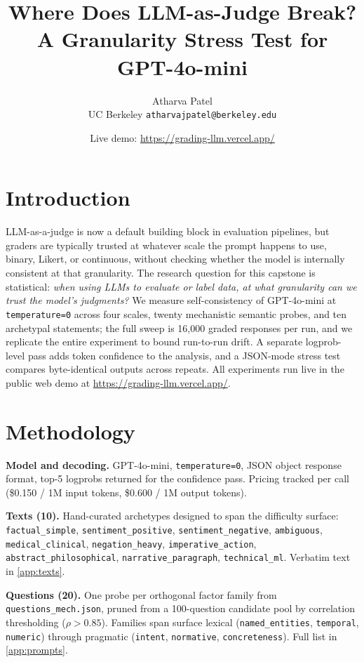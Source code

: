 \documentclass[11pt]{article}
\title{\vspace{-2em}Where Does LLM-as-Judge Break?\\\large A Granularity Stress Test for GPT-4o-mini}
\author{Atharva Patel \\ \small UC Berkeley \quad \texttt{atharvajpatel@berkeley.edu}}
\date{\small Live demo: \url{https://grading-llm.vercel.app/}}
\begin{document}
\maketitle

\section{Introduction}
\label{sec:intro}

LLM-as-a-judge is now a default building block in evaluation pipelines, but graders are typically trusted at whatever scale the prompt happens to use, binary, Likert, or continuous, without checking whether the model is internally consistent at that granularity. The research question for this capstone is statistical: \emph{when using LLMs to evaluate or label data, at what granularity can we trust the model's judgments?} We measure self-consistency of GPT-4o-mini at \texttt{temperature=0} across four scales, twenty mechanistic semantic probes, and ten archetypal statements; the full sweep is 16{,}000 graded responses per run, and we replicate the entire experiment to bound run-to-run drift. A separate logprob-level pass adds token confidence to the analysis, and a JSON-mode stress test compares byte-identical outputs across repeats. All experiments run live in the public web demo at \url{https://grading-llm.vercel.app/}.

\section{Methodology}
\label{sec:method}

\textbf{Model and decoding.} GPT-4o-mini, \texttt{temperature=0}, JSON object response format, top-5 logprobs returned for the confidence pass. Pricing tracked per call (\$0.150 / 1M input tokens, \$0.600 / 1M output tokens).

\textbf{Texts (10).} Hand-curated archetypes designed to span the difficulty surface: \texttt{factual\_simple}, \texttt{sentiment\_positive}, \texttt{sentiment\_negative}, \texttt{ambiguous}, \texttt{medical\_clinical}, \texttt{negation\_heavy}, \texttt{imperative\_action}, \texttt{abstract\_philosophical}, \texttt{narrative\_paragraph}, \texttt{technical\_ml}. Verbatim text in \autoref{app:texts}.

\textbf{Questions (20).} One probe per orthogonal factor family from \texttt{questions\_mech.json}, pruned from a 100-question candidate pool by correlation thresholding ($\rho > 0.85$). Families span surface lexical (\texttt{named\_entities}, \texttt{temporal}, \texttt{numeric}) through pragmatic (\texttt{intent}, \texttt{normative}, \texttt{concreteness}). Full list in \autoref{app:prompts}.
\end{document}
